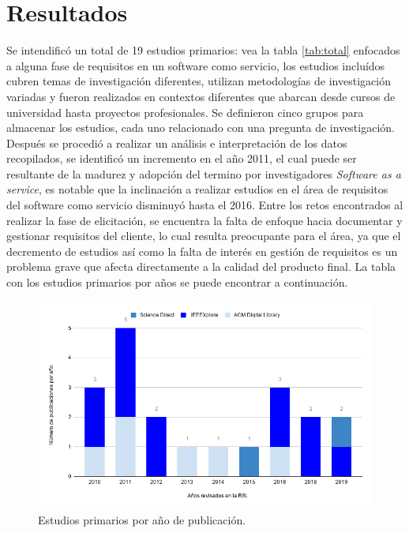 \documentclass[conference,onecolumn,10pt]{IEEEtran}
\begin{document}
\section{Resultados}
Se intendificó un total de 19 estudios primarios: vea la tabla \ref{tab:total} enfocados a alguna fase de requisitos en un software como servicio, 
los estudios incluídos cubren temas de investigación diferentes, utilizan metodologías de investigación variadas y fueron realizados en 
contextos diferentes que abarcan desde cursos de universidad hasta proyectos profesionales. Se definieron cinco grupos para almacenar los estudios,
 cada uno relacionado con una pregunta de investigación. Después se procedió a realizar un 
análisis e interpretación de los datos recopilados, se identificó un incremento en el año 2011, el cual puede 
ser resultante de la madurez y adopción del termino por investigadores \emph{Software as a service}, es notable 
que la inclinación a realizar estudios en el área de requisitos del software como servicio disminuyó hasta el 
2016. Entre los retos encontrados al realizar la fase de elicitación, se encuentra la falta de enfoque hacia 
documentar y gestionar requisitos del cliente, lo cual resulta preocupante para el área, ya que el decremento 
de estudios así como la falta de interés en gestión de requisitos es un problema grave que afecta directamente 
a la calidad del producto final. La tabla con los estudios primarios por años se puede encontrar a continuación.


\begin{figure}[!htbp]
   \includegraphics[width=\linewidth]{chart.png}
   \caption{Estudios primarios por año de publicación.}
   \label{fig:estudiostotales}
\end{figure}
\end{document}
